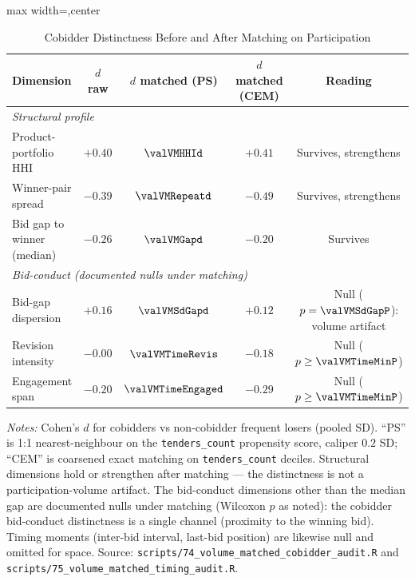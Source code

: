 \begin{table}[htbp]
\centering
\caption{Cobidder Distinctness Before and After Matching on Participation}
\label{tab:volume_matched_submission}
\footnotesize
\begin{adjustbox}{max width=\textwidth,center}
\begin{threeparttable}
\begin{tabular}{lcccc}
\toprule
Dimension & $d$ raw & $d$ matched (PS) & $d$ matched (CEM) & Reading \\
\midrule
\multicolumn{5}{l}{\textit{Structural profile}} \\
\hspace{6pt} Product-portfolio HHI & $+0.40$ & $\valVMHHId$ & $+0.41$ & Survives, strengthens \\
\hspace{6pt} Winner-pair spread & $-0.39$ & $\valVMRepeatd$ & $-0.49$ & Survives, strengthens \\
\hspace{6pt} Bid gap to winner (median) & $-0.26$ & $\valVMGapd$ & $-0.20$ & Survives \\
\midrule
\multicolumn{5}{l}{\textit{Bid-conduct (documented nulls under matching)}} \\
\hspace{6pt} Bid-gap dispersion & $+0.16$ & $\valVMSdGapd$ & $+0.12$ & Null ($p=\valVMSdGapP$): volume artifact \\
\hspace{6pt} Revision intensity & $-0.00$ & $\valVMTimeRevis$ & $-0.18$ & Null ($p\geq\valVMTimeMinP$) \\
\hspace{6pt} Engagement span & $-0.20$ & $\valVMTimeEngaged$ & $-0.29$ & Null ($p\geq\valVMTimeMinP$) \\
\bottomrule
\end{tabular}
\begin{tablenotes}
\footnotesize
\item \textit{Notes:} Cohen's $d$ for cobidders vs non-cobidder
frequent losers (pooled SD). ``PS'' is 1:1 nearest-neighbour on the
\texttt{tenders\_count} propensity score, caliper $0.2$ SD; ``CEM''
is coarsened exact matching on \texttt{tenders\_count} deciles.
Structural dimensions hold or strengthen after matching --- the
distinctness is not a participation-volume artifact. The bid-conduct
dimensions other than the median gap are documented nulls under
matching (Wilcoxon $p$ as noted): the cobidder bid-conduct
distinctness is a single channel (proximity to the winning bid).
Timing moments (inter-bid interval, last-bid position) are likewise
null and omitted for space. Source: \texttt{scripts/74\_volume\_matched\_cobidder\_audit.R}
and \texttt{scripts/75\_volume\_matched\_timing\_audit.R}.
\end{tablenotes}
\end{threeparttable}
\end{adjustbox}
\end{table}


